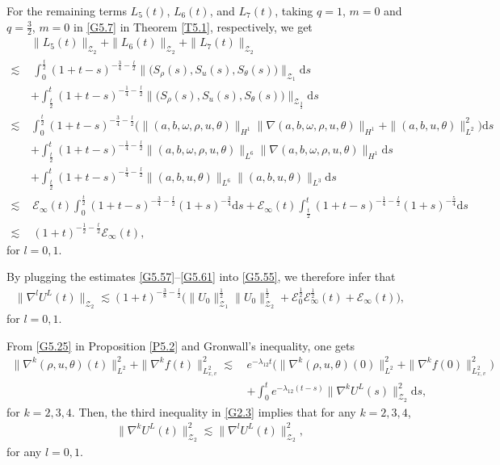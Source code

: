 \documentclass[reqno,11pt]{amsart}
\theoremstyle{plain}
\numberwithin{equation}{section}
\begin{document}
For the remaining terms $L_5(t)$, $L_6(t)$, and $L_7(t)$, taking $q=1$, $m=0$ and $q=\frac{3}{2}$, $m=0$ in  \eqref{G5.7} in Theorem \ref{T5.1}, respectively, we get
\begin{align}\label{G5.61}
&\|L_5(t)\|_{\mathcal{Z}_2}+\|L_6(t)\|_{\mathcal{Z}_2}+\|L_7(t)\|_{\mathcal{Z}_2} \nonumber\\
\lesssim &\,
\int_0^{\frac{t}{2}}(1+t-s)^{-\frac{3}{4}-\frac{l}{2
}}\big\|\big(S_\rho (s),S_u(s),S_\theta(s)\big)\big\|_{\mathcal{Z}_1}\mathrm{d}s\nonumber\\
&+\int_{\frac{t}{2}}^{t}(1+t-s)^{-\frac{1}{4}-\frac{l}{2}}\big\|\big(S_\rho (s),S_u(s),S_\theta(s)\big)\big\|_{\mathcal{Z}_{\frac{3}{2}}}\mathrm{d}s\nonumber\\
\lesssim\,&\int_0^{\frac{t}{2}}(1+t-s)^{-\frac{3}{4}-\frac{l}{2}}\big(\|(a,b,\omega,\rho,u,\theta)\|_{H^1}\|\nabla (a,b,\omega,\rho,u,\theta)\|_{H^1}+\|(a,b,u,\theta)\|_{L^2}^2 \big)\mathrm{d}s\nonumber\\
&+\int_{\frac{t}{2}}^t(1+t-s)^{-\frac{1}{4}-\frac{l}{2}} \|(a,b,\omega,\rho,u,\theta)\|_{L^6}\|\nabla(a,b,\omega,\rho,u,\theta)\|_{H^1} \mathrm{d}s\nonumber\\
&+\int_{\frac{t}{2}}^t(1+t-s)^{-\frac{1}{4}-\frac{l}{2}} \|(a,b,u,\theta)\|_{L^6}\|(a,b,u,\theta)\|_{L^3} \mathrm{d}s\nonumber\\
\lesssim&\,\mathcal{E}_{ \infty}(t)\int_0^{\frac{t}{2}}(1+t-s)^{-\frac{3}{4}-\frac{l}{2}}(1+s)^{-\frac{3}{4}}\mathrm{d}s +\mathcal{E}_{ \infty}(t)\int_{\frac{t}{2}}^t(1+t-s)^{-\frac{1}{4}-\frac{l}{2}}(1+s)^{-\frac{5}{4}}\mathrm{d}s\nonumber\\
\lesssim&\, (1+t)^{-\frac{1}{2}-\frac{l}{2}}\mathcal{E}_{ \infty}(t),
\end{align}
for $l=0,1$. 

By plugging the estimates  \eqref{G5.57}--\eqref{G5.61} into \eqref{G5.55}, 
we   therefore infer that  
\begin{align}\label{G5.62}
\|\nabla^l U^L(t)\|_{\mathcal{Z}_2}\lesssim (1+t)^{-\frac{3}{8}-\frac{l}{2}}
\big(   \|U_0\|_{\mathcal{Z}_1}^{\frac{1}{2}}\|U_0\|_{\mathcal{Z}_2}^{\frac{1}{2}}
+\mathcal{E}^{\frac{1}{2}}_0\mathcal{E}^{\frac{1}{2}}_{ \infty}(t)+\mathcal{E}_{ \infty}(t)\big),  
\end{align}
for $l=0,1$.

From \eqref{G5.25} in Proposition \ref{P5.2} and Gronwall's inequality, one gets
\begin{align}\label{G5.63}
\|\nabla^k(\rho,u,\theta)(t)\|_{L^2}^2+\|\nabla^k f(t)\|_{L_{x,v}^2}^2
\lesssim\, & e^{-\lambda_{12}t}\big( \|\nabla^k(\rho,u,\theta)(0)\|_{L^2}^2
+\|\nabla^k f(0)\|_{L_{x,v}^2}^2\big) \nonumber\\
& +\int_{0}^te^{-\lambda_{12}(t-s)} \|\nabla^k U^L(s)\|_{\mathcal{Z}_2}^2\mathrm{d}s,  
\end{align}
for $k=2,3,4$.
Then, the third inequality in \eqref{G2.3} implies that for any $k=2,3,4$,  
\begin{align}  \label{G5.64}
\|\nabla^k U^L(t)\|_{\mathcal{Z}_2}^2 \lesssim \|\nabla^l U^L(t)\|_{\mathcal{Z}_2}^2,  
\end{align}  
for any $l=0,1$.  
\end{document}
